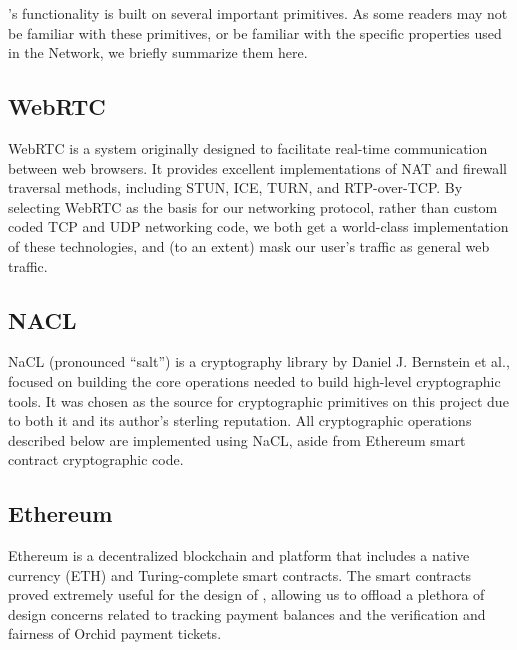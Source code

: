 
\Orchid’s functionality is built on several important primitives. As some readers may not be familiar with these primitives, or be familiar with the specific properties used in the \Orchid{} Network, we briefly summarize them here.

\subsection*{WebRTC}

WebRTC\cite{webrtc} is a system originally designed to facilitate real-time communication between web browsers. It provides excellent implementations of NAT and firewall traversal methods, including STUN, ICE, TURN, and RTP-over-TCP. By selecting WebRTC as the basis for our networking protocol, rather than custom coded TCP and UDP networking code, we both get a world-class implementation of these technologies, and (to an extent) mask our user's traffic as general web traffic.

\subsection*{NACL}

NaCL\cite{nacl} (pronounced ``salt'') is a cryptography library by Daniel J. Bernstein et al., focused on building the core operations needed to build high-level cryptographic tools. It was chosen as the source for cryptographic primitives on this project due to both it and its author's sterling reputation. All cryptographic operations described below are implemented using NaCL, aside from Ethereum smart contract cryptographic code.

\subsection*{Ethereum}

Ethereum\cite{ethereum} is a decentralized blockchain and platform that includes a native currency (ETH) and Turing-complete smart contracts. The smart contracts proved extremely useful for the design of \Orchid, allowing us to offload a plethora of design concerns related to tracking payment balances and the verification and fairness of Orchid payment tickets.

